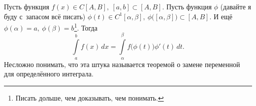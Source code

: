 
    	Пусть функция $f(x)\in C[A,B],\ [a,b]\subset[A,B]$. Пусть функция $\phi$ (давайте я буду с~запасом всё писать) $\phi(t)\in C^1[\alpha,\beta],\ \phi\big([\alpha,\beta]\big)\subset[A,B]$.
    	И ещё $\phi(\alpha)=a,\ \phi(\beta)=b$\footnote{Писать дольше, чем доказывать, чем понимать.}.
    	Тогда
    	$$\int\limits_a^bf(x)\,dx=\int\limits_\alpha^\beta f\big(\phi(t)\big)\phi'(t)\,dt.$$
    	Несложно понимать, что эта штука называется теоремой о замене переменной для определённого интеграла.
    